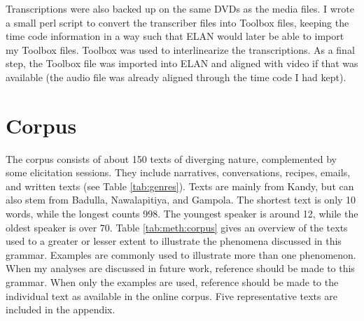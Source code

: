 Transcriptions were also backed up on the same DVDs as the media files. I wrote a small perl script to convert the transcriber files into Toolbox files, keeping the time code information in a way such that ELAN would later be able to import my Toolbox files. Toolbox was used to interlinearize the transcriptions. As a final step, the Toolbox file was imported into ELAN and aligned with video if that was available (the audio file was already aligned through the time code I had kept).


\section{Corpus}
The corpus consists of about 150 texts of diverging nature, complemented by some elicitation sessions. They include narratives, conversations, recipes, emails, and written texts (see Table \ref{tab:genres}). Texts are mainly from Kandy, but can also stem from Badulla, Nawalapitiya, and Gampola. The shortest text is only 10 words, while the longest counts 998. The youngest speaker is around 12, while the oldest speaker is over 70. Table \ref{tab:meth:corpus} gives an overview of the texts used to a greater or lesser extent to illustrate the phenomena discussed in this grammar. Examples are commonly used to illustrate more than one phenomenon. When my analyses are discussed in future work, reference should be made to this grammar. When only the examples are used, reference should be made to the individual text as available in the online corpus. Five representative texts are included in the appendix.

